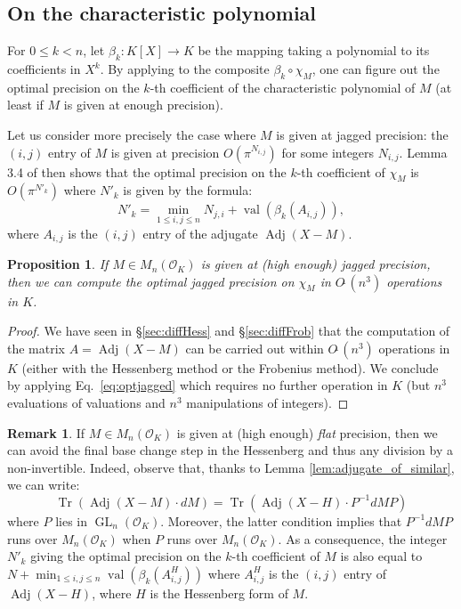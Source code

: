 \documentclass[sigconf]{acmart}
\DeclareMathOperator{\GL}{GL}
\DeclareMathOperator{\val}{val}
\DeclareMathOperator{\tr}{Tr}
\DeclareMathOperator{\adj}{Adj}
\newcommand{\OK}{\mathcal{O}_K}
\newcommand{\softO}{O\tilde{~}}
\newtheorem{prop}[theo]{Proposition}
\theoremstyle{definition}
\newtheorem{rem}[theo]{Remark}
\begin{document}
\subsection{On the characteristic polynomial}

For $0 \leq k < n$, let $\beta_k : K[X] \to K$ be the mapping taking a 
polynomial to its coefficients in $X^k$. By applying 
\cite[Lemma 3.4]{caruso-roe-vaccon:14a} to the composite $\beta_k 
\circ \chi_M$, one can figure out the optimal precision on the
$k$-th coefficient of the characteristic polynomial of $M$ (at
least if $M$ is given at enough precision).

Let us consider more precisely the case where $M$ is given at 
jagged precision: the $(i,j)$ entry of $M$ is given at precision 
$O(\pi^{N_{i,j}})$ for some integers $N_{i,j}$. 
Lemma 3.4 of \cite{caruso-roe-vaccon:14a} then shows that
the optimal precision on the $k$-th coefficient of $\chi_M$ is 
$O(\pi^{N'_k})$ where $N'_k$ is given by the formula:
\begin{equation}
\label{eq:optjagged}
N'_k = \min_{1 \leq i, j\leq n} N_{j,i} + \val(\beta_k(A_{i,j})),
\end{equation}
where $A_{i,j}$ is the $(i,j)$ entry of the adjugate $\adj(X{-}M)$.

\begin{prop} \label{prop:optimal_jagged}
If $M \in M_n(\OK)$ is given at (high enough) jagged precision, 
then we can compute the optimal jagged precision on $\chi_M$ in 
$\softO (n^3)$ operations in $K$.
\end{prop}

\begin{proof}
We have seen in \S \ref{sec:diffHess} and \S \ref{sec:diffFrob}
that the computation of the matrix $A = \adj(X{-}M)$ can be carried out 
within $\softO(n^3)$ operations in $K$ (either with the Hessenberg 
method or the Frobenius method). We conclude by applying 
Eq.~\eqref{eq:optjagged} which requires no further operation in $K$
(but $n^3$ evaluations of valuations and $n^3$ manipulations of 
integers).
\end{proof}

\begin{rem}
If $M \in M_n(\OK)$ is given at (high enough) \emph{flat} precision, 
then we can avoid the final base change step in the Hessenberg 
and thus any division by a non-invertible.
Indeed, observe that, thanks to Lemma \ref{lem:adjugate_of_similar}, 
we can write:
$$\tr(\adj (X{-}M) \cdot dM)=\tr(\adj (X{-}H)\cdot P^{-1} dM P)$$
where $P$ lies in $\GL_n(\OK)$. Moreover, the latter condition implies
that $P^{-1} dM P$ runs over $M_n(\OK)$ when $P$ runs over $M_n(\OK)$.
As a consequence, the integer $N'_k$ giving the optimal precision on the 
$k$-th coefficient of $M$ is also equal to
$N + \min_{1 \leq i, j\leq n} \val(\beta_k(A^H_{i,j}))$
where $A^H_{i,j}$ is the $(i,j)$ entry of $\adj(X{-}H)$,
where $H$ is the Hessenberg form of $M$.
\end{rem}
\end{document}
